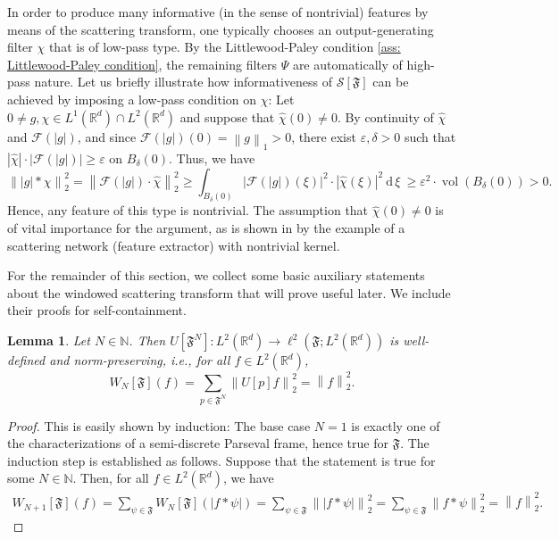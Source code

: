 \documentclass[11pt]{amsart}
\newcommand{\R}{{\mathbb{R}}}
\newcommand{\N}{\mathbb{N}}
\newcommand{\s}{\mathcal{S}}
\newcommand{\dxi}{\:\mathrm{d}\,\xi\:}
\newcommand{\norm}[1]{\ensuremath{\left\lVert\text{}#1\text{}\right\rVert}}
\DeclareMathOperator{\vol}{vol}
\newtheorem{lemma}[theorem]{Lemma}
\newenvironment{proof sketch} {\textit{Proof sketch.}}{}
\begin{document}
  In order to produce many informative (in the sense of nontrivial) features by means of the scattering transform, one typically chooses an output-generating filter $\chi$ that is of low-pass type. By the Littlewood-Paley condition \eqref{ass: Littlewood-Paley condition}, the remaining filters $\Psi$ are automatically of high-pass nature. Let us briefly illustrate how informativeness of $\s[\mathfrak{F}]$ can be achieved by imposing a low-pass condition on $\chi$: Let $0\neq g,\chi \in L^1(\R^d)\cap L^2(\R^d)$ and suppose that $\widehat{\chi}(0)\neq 0$. By continuity of $\widehat{\chi}$ and $\mathcal{F}(|g|)$, and since $\mathcal{F}(|g|)(0)=\norm{g}_1 >0$, there exist $\varepsilon,\delta>0$ such that $|\widehat{\chi}|\cdot|\mathcal{F}(|g|)|\geq \varepsilon$ on $B_\delta(0)$. Thus, we have
  \[\norm{|g|*\chi}_2^2=\norm{\mathcal{F}(|g|)\cdot \widehat{\chi}}_2^2\geq \int_{B_\delta(0)} |\mathcal{F}(|g|)(\xi)|^2 \cdot |\widehat{\chi}(\xi)|^2 \dxi \geq \varepsilon^2 \cdot \vol(B_\delta(0))>0.\]
  Hence, any feature of this type is nontrivial. The assumption that $\widehat{\chi}(0)\neq 0$ is of vital importance for the argument, as is shown in \cite[Appendix A]{wiatowski2017energy} by the example of a scattering network (feature extractor) with nontrivial kernel.
  
  For the remainder of this section, we collect some basic auxiliary statements about the windowed scattering transform that will prove useful later. We include their proofs for self-containment.
  
  \begin{lemma}\label{lem: U is norm-preserving if we consider the whole Parseval frame}
    Let $N \in \N$. Then $U[\mathfrak{F}^N]:L^2(\R^d)\to \ell^2(\mathfrak{F};L^2(\R^d))$ is well-defined and norm-preserving, i.e., for all $f \in L^2(\R^d)$,
    \[W_N[\mathfrak{F}](f)=\sum_{p \in \mathfrak{F}^N}\norm{U[p]f}_2^2=\norm{f}_2^2.\]
  \end{lemma}
  \begin{proof}
    This is easily shown by induction: The base case $N=1$ is exactly one of the characterizations of a semi-discrete Parseval frame, hence true for $\mathfrak{F}$. The induction step is established as follows. Suppose that the statement is true for some $N \in \N$. Then, for all $f \in L^2(\R^d)$, we have
    \begin{align*}
      W_{N+1}[\mathfrak{F}](f)=\sum_{\psi \in \mathfrak{F}} W_N[\mathfrak{F}](|f*\psi|)= \sum_{\psi \in \mathfrak{F}} \norm{|f*\psi|}_2^2 = \sum_{\psi \in \mathfrak{F}} \norm{f*\psi}_2^2=\norm{f}_2^2.
    \end{align*}
  \end{proof}
  
\end{document}
